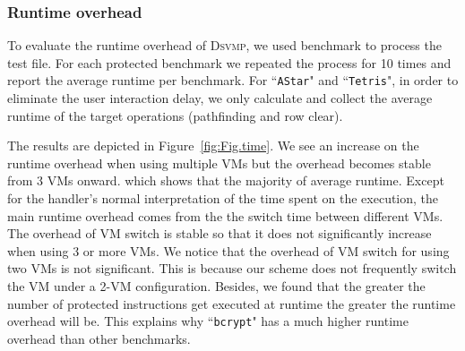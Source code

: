 \documentclass[preprint,12pt,3p]{elsarticle}
\newcommand{\DSVMP}{\textsc{Dsvmp}\xspace}
\newcommand\FIXME[1]{\textcolor{red}{FIX:}\textcolor{red}{#1}}
\begin{document}
\subsubsection{Runtime overhead}

To evaluate the runtime overhead of \DSVMP, we used benchmark to process the test file.
For each protected benchmark we repeated the process for 10 times and report the average runtime per benchmark.
For ``\texttt{AStar}" and ``\texttt{Tetris}", in order to eliminate the user interaction delay,
we only calculate and collect the average runtime of the target operations (pathfinding and row clear).

The results are depicted in Figure~\ref{fig:Fig.time}. We see an increase on the runtime overhead when
using multiple VMs but the overhead becomes stable from 3 VMs onward.
which shows that the majority of average runtime.
Except for the handler's normal interpretation of the time spent on the execution,
the main runtime overhead comes from the the switch time between different VMs.
The overhead of VM switch is stable so that it does not significantly increase when
using 3 or more VMs. We notice that the overhead of VM switch for using two VMs
is not significant. This is because our scheme does not frequently switch
the VM under a 2-VM configuration.
Besides, we found that the greater the number of protected instructions get executed at runtime
the greater the runtime overhead will be.
This explains why ``\texttt{bcrypt}" has a much higher runtime overhead than other benchmarks.



\end{document}
